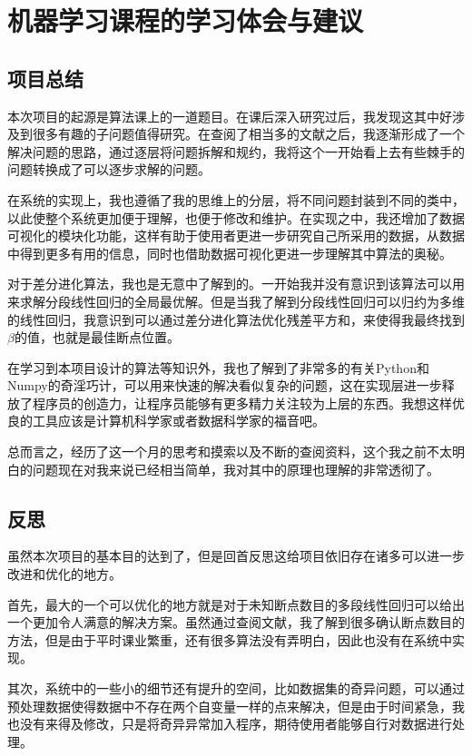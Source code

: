 
\section{机器学习课程的学习体会与建议}
\subsection{项目总结}

本次项目的起源是算法课上的一道题目。在课后深入研究过后，我发现这其中好涉及到很多有趣的子问题值得研究。在查阅了相当多的文献之后，我逐渐形成了一个解决问题的思路，通过逐层将问题拆解和规约，我将这个一开始看上去有些棘手的问题转换成了可以逐步求解的问题。

在系统的实现上，我也遵循了我的思维上的分层，将不同问题封装到不同的类中，以此使整个系统更加便于理解，也便于修改和维护。在实现之中，我还增加了数据可视化的模块化功能，这样有助于使用者更进一步研究自己所采用的数据，从数据中得到更多有用的信息，同时也借助数据可视化更进一步理解其中算法的奥秘。

对于差分进化算法，我也是无意中了解到的。一开始我并没有意识到该算法可以用来求解分段线性回归的全局最优解。但是当我了解到分段线性回归可以归约为多维的线性回归，我意识到可以通过差分进化算法优化残差平方和，来使得我最终找到$\beta$的值，也就是最佳断点位置。

在学习到本项目设计的算法等知识外，我也了解到了非常多的有关Python和Numpy的奇淫巧计，可以用来快速的解决看似复杂的问题，这在实现层进一步释放了程序员的创造力，让程序员能够有更多精力关注较为上层的东西。我想这样优良的工具应该是计算机科学家或者数据科学家的福音吧。

总而言之，经历了这一个月的思考和摸索以及不断的查阅资料，这个我之前不太明白的问题现在对我来说已经相当简单，我对其中的原理也理解的非常透彻了。

\subsection{反思}

虽然本次项目的基本目的达到了，但是回首反思这给项目依旧存在诸多可以进一步改进和优化的地方。

首先，最大的一个可以优化的地方就是对于未知断点数目的多段线性回归可以给出一个更加令人满意的解决方案。虽然通过查阅文献，我了解到很多确认断点数目的方法，但是由于平时课业繁重，还有很多算法没有弄明白，因此也没有在系统中实现。

其次，系统中的一些小的细节还有提升的空间，比如数据集的奇异问题，可以通过预处理数据使得数据中不存在两个自变量一样的点来解决，但是由于时间紧急，我也没有来得及修改，只是将奇异异常加入程序，期待使用者能够自行对数据进行处理。


